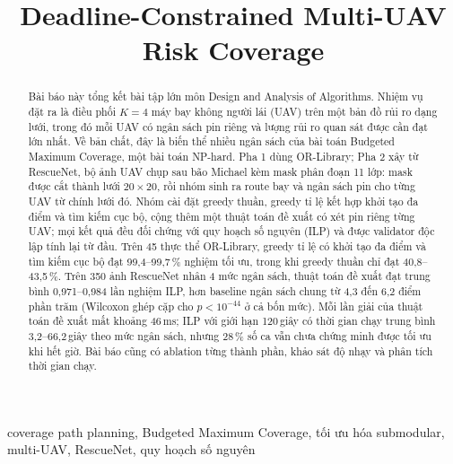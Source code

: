\documentclass[conference]{IEEEtran}
\begin{document}
\title{Deadline-Constrained Multi-UAV Risk Coverage}

\author{
}
\maketitle

\begin{abstract}
Bài báo này tổng kết bài tập lớn môn Design and Analysis of Algorithms. Nhiệm vụ đặt ra là
điều phối $K=4$ máy bay không người lái (UAV) trên một bản đồ rủi ro dạng lưới, trong đó
mỗi UAV có ngân sách pin riêng và lượng rủi ro quan sát được cần đạt lớn nhất. Về bản chất,
đây là biến thể nhiều ngân sách của bài toán Budgeted Maximum Coverage, một bài toán
NP-hard. Pha 1 dùng OR-Library; Pha 2 xây từ RescueNet, bộ ảnh UAV chụp sau bão Michael kèm mask
phân đoạn 11 lớp: mask được cắt thành lưới $20\times20$, rồi nhóm sinh ra route bay và ngân
sách pin cho từng UAV từ chính lưới đó. Nhóm cài đặt greedy thuần, greedy tỉ lệ kết hợp khởi tạo đa điểm
và tìm kiếm cục bộ, cộng thêm một thuật toán đề xuất có xét pin riêng từng UAV; mọi kết quả
đều đối chứng với quy hoạch số nguyên (ILP) và được validator độc lập tính lại từ đầu. Trên
45 thực thể OR-Library, greedy tỉ lệ có khởi tạo đa điểm và tìm kiếm cục bộ đạt 99,4--99,7\,\% nghiệm
tối ưu, trong khi greedy thuần chỉ đạt 40,8--43,5\,\%. Trên 350 ảnh RescueNet nhân 4 mức
ngân sách, thuật toán đề xuất đạt trung bình 0,971--0,984 lần nghiệm ILP, hơn baseline ngân
sách chung từ 4,3 đến 6,2 điểm phần trăm (Wilcoxon ghép cặp cho $p < 10^{-44}$ ở cả bốn
mức). Mỗi lần giải của thuật toán đề xuất mất khoảng 46\,ms; ILP với giới hạn 120\,giây
có thời gian chạy trung bình 3,2--66,2\,giây theo mức ngân sách, nhưng 28\,\% số ca
vẫn chưa chứng minh được tối ưu khi hết giờ. Bài báo
cũng có ablation từng thành phần, khảo sát độ nhạy và phân tích thời gian chạy.
\end{abstract}

\begin{IEEEkeywords}
coverage path planning, Budgeted Maximum Coverage, tối ưu hóa submodular, multi-UAV,
RescueNet, quy hoạch số nguyên
\end{IEEEkeywords}
\end{document}
